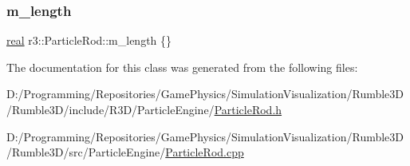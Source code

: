 \subsubsection{\texorpdfstring{m\+\_\+length}{m\_length}}
{\footnotesize\ttfamily \mbox{\hyperlink{namespacer3_ab2016b3e3f743fb735afce242f0dc1eb}{real}} r3\+::\+Particle\+Rod\+::m\+\_\+length \{\}\hspace{0.3cm}{\ttfamily [protected]}}



The documentation for this class was generated from the following files\+:\begin{DoxyCompactItemize}
\item 
D\+:/\+Programming/\+Repositories/\+Game\+Physics/\+Simulation\+Visualization/\+Rumble3\+D/\+Rumble3\+D/include/\+R3\+D/\+Particle\+Engine/\mbox{\hyperlink{_particle_rod_8h}{Particle\+Rod.\+h}}\item 
D\+:/\+Programming/\+Repositories/\+Game\+Physics/\+Simulation\+Visualization/\+Rumble3\+D/\+Rumble3\+D/src/\+Particle\+Engine/\mbox{\hyperlink{_particle_rod_8cpp}{Particle\+Rod.\+cpp}}\end{DoxyCompactItemize}
